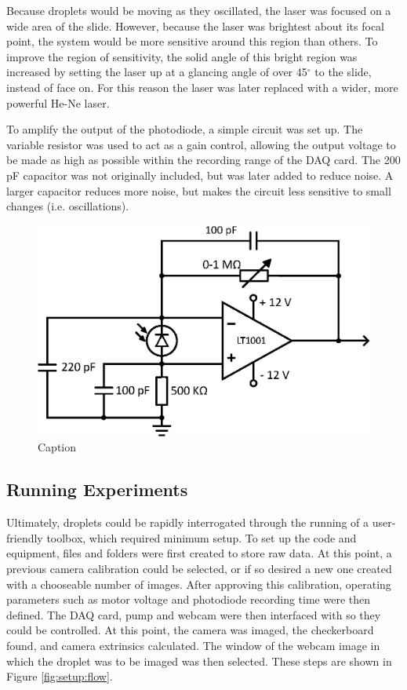 \documentclass{physics_article_B}
\begin{document}
        Because droplets would be moving as they oscillated, the laser was focused on a wide area of the slide. However, because the laser was brightest about its focal point, the system would be more sensitive around this region than others. To improve the region of sensitivity, the solid angle of this bright region was increased by setting the laser up at a glancing angle of over 45$^{\circ}$ to the slide, instead of face on. For this reason the laser was later replaced with a wider, more powerful He-Ne laser.
        
        To amplify the output of the photodiode, a simple circuit was set up\cite{artofelectronics}. The variable resistor was used to act as a gain control, allowing the output voltage to be made as high as possible within the recording range of the DAQ card. The 200 pF capacitor was not originally included, but was later added to reduce noise. A larger capacitor reduces more noise, but makes the circuit less sensitive to small changes (i.e. oscillations).
    
        \begin{figure}[H]
            \centering
            \includegraphics[scale=0.8]{Figures/PDCircuit.eps}
            \caption{Caption}
            \label{fig:my_label}
        \end{figure}
    

    \subsection{Running Experiments\label{sect:method:exp}}
        
        Ultimately, droplets could be rapidly interrogated through the running of a user-friendly toolbox, which required minimum setup. To set up the code and equipment, files and folders were first created to store raw data. At this point, a previous camera calibration could be selected, or if so desired a new one created with a chooseable number of images. After approving this calibration, operating parameters such as motor voltage and photodiode recording time were then defined. The DAQ card, pump and webcam were then interfaced with so they could be controlled. At this point, the camera was imaged, the checkerboard found, and camera extrinsics calculated. The window of the webcam image in which the droplet was to be imaged was then selected. These steps are shown in Figure \ref{fig:setup:flow}.     
        
\end{document}
